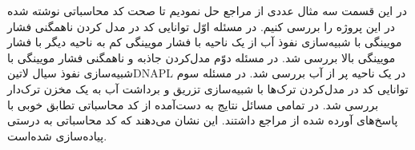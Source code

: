 در این قسمت سه مثال عددی از مراجع  حل نمودیم تا صحت کد محاسباتی نوشته شده در این پروژه را بررسی کنیم. در مسئله اوّل توانایی کد در مدل کردن ناهمگنی فشار مویینگی با شبیه‌سازی نفوذ آب از یک ناحیه با فشار مویینگی کم به ناحیه دیگر با فشار مویینگی بالا بررسی شد. در مسئله دوّم مدل‌کردن جاذبه و ناهمگنی فشار مویینگی با شبیه‌سازی نفوذ سیال ‌لاتین{DNAPL} در یک ناحیه پر از آب بررسی شد. در مسئله سوم توانایی کد در مدل‌کردن ترک‌ها با شبیه‌سازی تزریق و برداشت آب به یک مخزن ترک‌دار بررسی شد. در تمامی مسائل نتایج به دست‌آمده از کد محاسباتی تطابق خوبی با پاسخ‌های آورده شده از مراجع داشتند. این نشان می‌دهند که کد محاسباتی به درستی پیاده‌سازی شده‌است.

